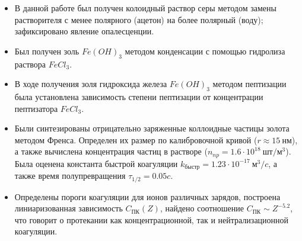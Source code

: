 \documentclass[a4paper,12pt]{article}
\begin{document}
\begin{itemize}
\item В данной работе был получен колоидный раствор серы методом замены растворителя с менее полярного (ацетон) на более полярный (воду); зафиксировано явление опалесценции.
\item Был получен золь $Fe(OH)_3$ методом конденсации с помощью гидролиза раствора $FeCl_3$.
\item В ходе получения золя гидроксида железа $Fe(OH)_3$ методом пептизации была установлена зависимость степени пептизации от концентрации пептизатора $FeCl_3$.
\item Были синтезированы отрицательно заряженные коллоидные частицы золота методом Френса. Определен их размер по калибровочной кривой ($r\approx15~нм$), а также вычислена концентрация частиц в растворе ($n_{np} = 1.6\cdot10^{18}~шт/м^3$). Была оценена константа быстрой коагуляции $k_{быстр} = 1.23\cdot10^{-17}~м^3/c$, а также время полупревращения $\tau_{1/2} = 0.05c$.
\item Определены пороги коагуляции для ионов различных зарядов, построена линиаризованная зависимость $C_{ПК}(Z)$, найдено соотношение $C_{ПК}\sim Z^{-5.2}$, что говорит о протекании как концентрационной, так и нейтрализационной коагуляции.
\end{itemize}
\end{document}
